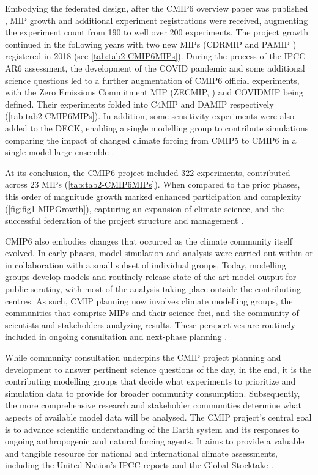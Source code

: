 \documentclass[gmd, preprint]{copernicus}
\begin{document}
Embodying the federated design, after the CMIP6 overview paper was published \citet{eyring_overview_2016}, MIP growth and additional experiment registrations were received, augmenting the experiment count from 190 to well over 200 experiments. The project growth continued in the following years with two new MIPs (CDRMIP \citet{keller_carbon_2018} and PAMIP \citet{smith_polar_2019}) registered in 2018 (see \autoref{tab:tab2-CMIP6MIPs}). During the process of the IPCC AR6 assessment, the development of the COVID pandemic and some additional science questions led to a further augmentation of CMIP6 official experiments, with the Zero Emissions Commitment MIP (ZECMIP, \citet{jones_zero_2019}) and COVIDMIP \citep{lamboll_modifying_2021} being defined. Their experiments folded into C4MIP and DAMIP respectively (\autoref{tab:tab2-CMIP6MIPs}). In addition, some sensitivity experiments were also added to the DECK, enabling a single modelling group to contribute simulations comparing the impact of changed climate forcing from CMIP5 to CMIP6 in a single model large ensemble \citep{fyfe_significant_2021}.

At its conclusion, the CMIP6 project included 322 experiments, contributed across 23 MIPs (\autoref{tab:tab2-CMIP6MIPs}). When compared to the prior phases, this order of magnitude growth marked enhanced participation and complexity (\autoref{fig:fig1-MIPGrowth}), capturing an expansion of climate science, and the successful federation of the project structure and management \citep{eyring_overview_2016}.

CMIP6 also embodies changes that occurred as the climate community itself evolved. In early phases, model simulation and analysis were carried out within or in collaboration with a small subset of individual groups. Today, modelling groups develop models and routinely release state-of-the-art model output for public scrutiny, with most of the analysis taking place outside the contributing centres. As such, CMIP planning now involves climate modelling groups, the communities that comprise MIPs and their science foci, and the community of scientists and stakeholders analyzing results. These perspectives are routinely included in ongoing consultation and next-phase planning \citep{stouffer_cmip5_2017}.

While community consultation underpins the CMIP project planning and development to answer pertinent science questions of the day, in the end, it is the contributing modelling groups that decide what experiments to prioritize and simulation data to provide for broader community consumption. Subsequently, the more comprehensive research and stakeholder communities determine what aspects of available model data will be analysed. The CMIP project's central goal is to advance scientific understanding of the Earth system and its responses to ongoing anthropogenic and natural forcing agents. It aims to provide a valuable and tangible resource for national and international climate assessments, including the United Nation's IPCC reports and the Global Stocktake \citep{stouffer_cmip5_2017}.
\end{document}

